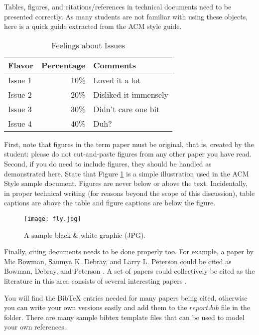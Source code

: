 \documentclass{sig-alternate}
\begin{document}
Tables, figures, and citations/references in technical
documents need to be presented correctly. As many students
are not familiar with using these objects, here is a quick
guide extracted from the ACM style guide.

\begin{table}
\centering
\caption{Feelings about Issues}
\begin{tabular}{|l|r|l|} \hline
Flavor&Percentage&Comments\\ \hline
Issue 1 &  10\% & Loved it a lot\\ \hline
Issue 2 &  20\% & Disliked it immensely\\ \hline
Issue 3 &  30\% & Didn't care one bit\\ \hline
Issue 4 &  40\% & Duh?\\ \hline
\end{tabular}
\end{table}


First, note that figures in the term paper must be original,
that is, created by the student: please do not cut-and-paste
figures from any other paper you have read. Second, if you
do need to include figures, they should be handled as
demonstrated here. State that Figure \ref{sample graphic} is
a simple illustration used in the ACM Style sample
document. Figures are never below or above the
text. Incidentally, in proper technical writing (for reasons
beyond the scope of this discussion), table captions are
above the table and figure captions are below the figure.

\begin{figure}[htb]
\label{sample graphic}
\begin{center}
\texttt{[image: fly.jpg]}
\caption{A sample black \& white graphic (JPG).}
\end{center}
\end{figure}

Finally, citing documents needs to be done properly too. For
example, a paper by Mic Bowman, Saumya K. Debray, and Larry
L. Peterson could be cited as Bowman, Debray, and Peterson
\cite{bowman:reasoning}. A set of papers could collectively
be cited as the literature in this area consists of several
interesting papers
\cite{braams:babel,clark:pct,herlihy:methodology}.

You will find the BibTeX entries needed for many papers being cited,
otherwise you can write your own versions easily and add them to the
$report.bib$ file in the folder. There are many sample bibtex
template files that can be used to model your own references.
\end{document}
